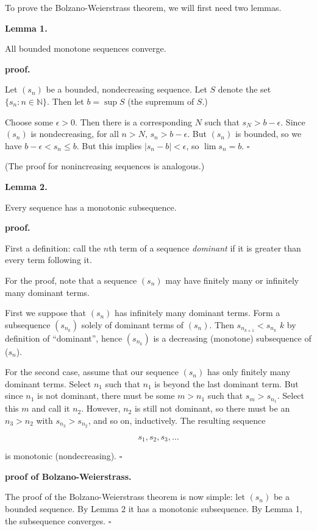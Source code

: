 \documentclass{article}
\begin{document}
To prove the Bolzano-Weierstrass theorem, we will first need two lemmas.  

{\bf Lemma 1.}

All bounded monotone sequences converge.

{\bf proof.}

Let $(s_n)$ be a bounded, nondecreasing sequence.  Let $S$ denote the set $\{s_n : n \in \mathbb{N}\}$.  Then let $b=\sup S$ (the supremum of $S$.)

Choose some $\epsilon > 0$.  Then there is a corresponding $N$ such that $s_N>b-\epsilon$.  Since $(s_n)$ is nondecreasing, for all $n>N$, $s_n > b-\epsilon$.  But $(s_n)$ is bounded, so we have $b-\epsilon < s_n \le b$.  But this implies $|s_n-b|<\epsilon$, so $\lim s_n= b$. $\square$

(The proof for nonincreasing sequences is analogous.)

{\bf Lemma 2.}

Every sequence has a monotonic subsequence.

{\bf proof.}

First a definition: call the $n$th term of a sequence \emph{dominant} if it is greater than every term following it.

For the proof, note that a sequence $(s_n)$ may have finitely many or infinitely many dominant terms.  

First we suppose that $(s_n)$ has infinitely many dominant terms.  Form a subsequence $(s_{n_k})$ solely of dominant terms of $(s_n)$.  Then $s_{n_{k+1}} < s_{n_k}$ $k$ by definition of ``dominant'', hence $(s_{n_k})$ is a decreasing  (monotone) subsequence of ($s_n$).

For the second case, assume that our sequence $(s_n)$ has only finitely many dominant terms.  Select $n_1$ such that $n_1$ is beyond the last dominant term.  But since $n_1$ is not dominant, there must be some $m>n_1$ such that $s_m > s_{n_1}$.  Select this $m$ and call it $n_2$.  However, $n_2$ is still not dominant, so there must be an $n_3>n_2$ with $s_{n_3} > s_{n_2}$, and so on, inductively.  The resulting sequence

$$ s_1,s_2,s_3,\ldots $$

is monotonic (nondecreasing). $\square$

{\bf proof of Bolzano-Weierstrass.}

The proof of the Bolzano-Weierstrass theorem is now simple: let $(s_n)$ be a bounded sequence.  By Lemma 2 it has a monotonic subsequence.  By Lemma 1, the subsequence converges.  $\square$
\end{document}
